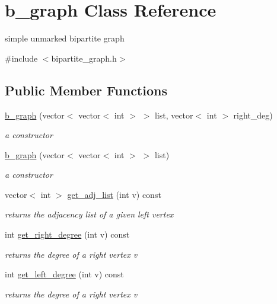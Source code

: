 \hypertarget{classb__graph}{}\section{b\+\_\+graph Class Reference}
\label{classb__graph}


simple unmarked bipartite graph  




{\ttfamily \#include $<$bipartite\+\_\+graph.\+h$>$}

\subsection*{Public Member Functions}
\begin{DoxyCompactItemize}
\item 
\hyperlink{classb__graph_a6032fbf9681d275260dd9a8587447e61}{b\+\_\+graph} (vector$<$ vector$<$ int $>$ $>$ list, vector$<$ int $>$ right\+\_\+deg)
\begin{DoxyCompactList}\small\item\em a constructor \end{DoxyCompactList}\item 
\hyperlink{classb__graph_af94e3bc6694a312f13c9305ec5ffe4ee}{b\+\_\+graph} (vector$<$ vector$<$ int $>$ $>$ list)
\begin{DoxyCompactList}\small\item\em a constructor \end{DoxyCompactList}\item 
vector$<$ int $>$ \hyperlink{classb__graph_aa81c7179b9c6cb4986c4b41e84a85799}{get\+\_\+adj\+\_\+list} (int v) const
\begin{DoxyCompactList}\small\item\em returns the adjacency list of a given left vertex \end{DoxyCompactList}\item 
int \hyperlink{classb__graph_a1caf2e1ca8ee19e7407f489be6b171b8}{get\+\_\+right\+\_\+degree} (int v) const
\begin{DoxyCompactList}\small\item\em returns the degree of a right vertex v \end{DoxyCompactList}\item 
int \hyperlink{classb__graph_ac64ac5cb1197d8008e07babc333eb3ea}{get\+\_\+left\+\_\+degree} (int v) const
\begin{DoxyCompactList}\small\item\em returns the degree of a right vertex v \end{DoxyCompactList}\item 

\end{DoxyCompactItemize}
